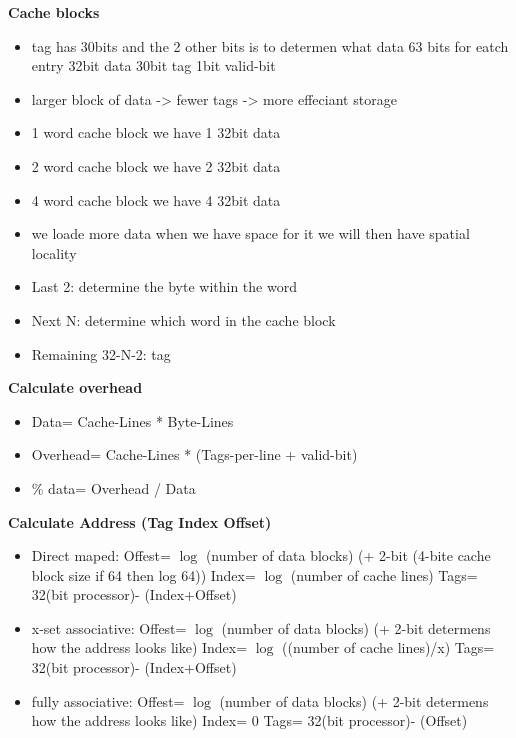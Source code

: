 \documentclass{article}
\begin{document}
\textbf{Cache blocks}
\begin{itemize}
\item tag has 30bits and the 2 other bits is to determen what data
  63 bits for eatch entry 32bit data 30bit tag 1bit valid-bit 
\item larger block of data -> fewer tags -> more effeciant storage
\item 1 word cache block we have 1 32bit data
\item 2 word cache block we have 2 32bit data 
\item 4 word cache block we have 4 32bit data
\item we loade more data when we have space for it
  we will then have spatial locality
\item Last 2: determine the byte within the word   
\item Next N: determine which word in the cache block 
\item Remaining 32-N-2: tag
\end{itemize}

\textbf{Calculate overhead}
\begin{itemize}
\item  Data= Cache-Lines * Byte-Lines
\item  Overhead= Cache-Lines * (Tags-per-line + valid-bit)
\item  \% data=  Overhead / Data
\end{itemize}

\textbf{Calculate Address (Tag Index Offset)} %
\begin{itemize}
\item  Direct maped: \newline
  Offest= $\log$ (number of data blocks)  (+ 2-bit (4-bite cache block size if 64 then log 64)) \newline
  Index= $\log$ (number of cache lines) \newline
  Tags= 32(bit processor)- (Index+Offset) 
\item  x-set associative: \newline
  Offest= $\log$ (number of data blocks)  (+ 2-bit determens how the address looks like) \newline
  Index= $\log$ ((number of cache lines)/x) \newline
  Tags= 32(bit processor)- (Index+Offset)
\item  fully associative: \newline
  Offest= $\log$ (number of data blocks)  (+ 2-bit determens how the address looks like) \newline
  Index= 0 \newline
  Tags= 32(bit processor)- (Offset)
\end{itemize}
\end{document}

